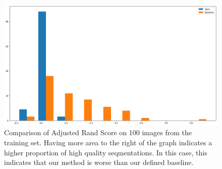 \documentclass[twocolumn]{article}
\newcommand{\figlab}[1]{\label{fig:#1}}
\begin{document}
\begin{figure}
  \centering

  \includegraphics[width=\linewidth]{figs/bars.png}

  \caption{Comparison of Adjusted Rand Score on 100 images from the training set. Having more area to the right of the graph
indicates a higher proportion of high quality seqmentations. In this case, this indicates that our method is worse than our
defined baseline.
  }
  \figlab{bars}

\end{figure}
\end{document}
